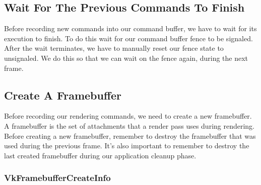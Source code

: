 \begin{minipage}{\linewidth}{\noindent}
    
\end{minipage}

\subsection{Wait For The Previous Commands To Finish}

Before recording new commands into our command buffer, we have to wait for its
execution to finish.
To do this wait for our command buffer fence to be signaled.
After the wait terminates, we have to manually reset our fence state to unsignaled.
We do this so that we can wait on the fence again, during the next frame.

\begin{minipage}{\linewidth}{\noindent}
    
\end{minipage}

\subsection{Create A Framebuffer}

Before recording our rendering commands, we need to create a new framebuffer.
A framebuffer is the set of attachments that a render pass uses during rendering.
Before creating a new framebuffer, remember to destroy the framebuffer that was used
during the previous frame.
It's also important to remember to destroy the last created framebuffer during
our application cleanup phase.

\begin{minipage}{\linewidth}{\noindent}
    
\end{minipage}

\subsubsection{VkFramebufferCreateInfo}

